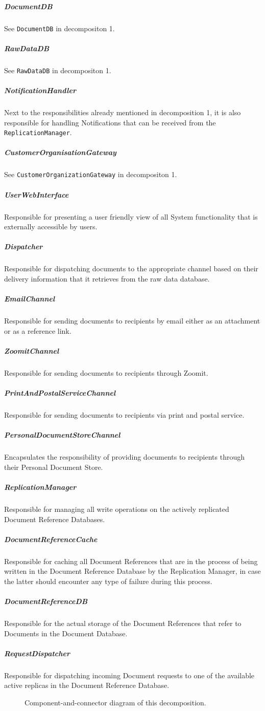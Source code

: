 \documentclass[a4paper,10pt]{article}
\begin{document}
\subparagraph{DocumentDB}
See \texttt{DocumentDB} in decompositon 1.

\subparagraph{RawDataDB}
See \texttt{RawDataDB} in decompositon 1.

\subparagraph{NotificationHandler}
Next to the responsibilities already mentioned in decomposition 1, it is also responsible for handling Notifications that can be received from the \texttt{ReplicationManager}.

\subparagraph{CustomerOrganisationGateway}
See \texttt{CustomerOrganizationGateway} in decompositon 1.

\subparagraph{UserWebInterface}
Responsible for presenting a user friendly view of all System functionality that is externally accessible by users.

\subparagraph{Dispatcher}
Responsible for dispatching documents to the appropriate channel based on their delivery information that it retrieves from the raw data database.

\subparagraph{EmailChannel}
Responsible for sending documents to recipients by email either as an attachment or as a reference link.

\subparagraph{ZoomitChannel}
Responsible for sending documents to recipients through Zoomit.

\subparagraph{PrintAndPostalServiceChannel}
Responsible for sending documents to recipients via print and postal service.

\subparagraph{PersonalDocumentStoreChannel}
Encapsulates the responsibility of providing documents to recipients through their Personal Document Store.

\subparagraph{ReplicationManager}
Responsible for managing all write operations on the actively replicated Document Reference Databases.

\subparagraph{DocumentReferenceCache}
Responsible for caching all Document References that are in the process of being written in the Document Reference Database by the Replication Manager, in case the latter should encounter any type of failure during this process.

\subparagraph{DocumentReferenceDB}
Responsible for the actual storage of the Document References that refer to Documents in the Document Database.

\subparagraph{RequestDispatcher}
Responsible for dispatching incoming Document requests to one of the available active replicas in the Document Reference Database.


\begin{figure}[!htp]
	\centering
	\caption{Component-and-connector diagram of this decomposition.
	}\label{fig:it1-cc_main}
\end{figure}
\end{document}
